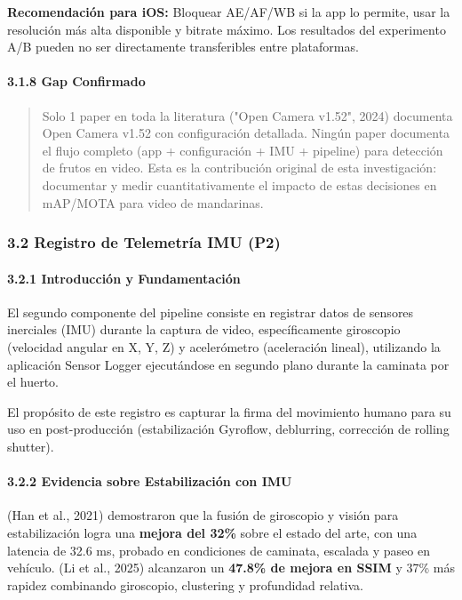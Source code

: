 \textbf{Recomendación para iOS:} Bloquear AE/AF/WB si la app lo permite, usar la resolución más alta disponible y bitrate máximo. Los resultados del experimento A/B pueden no ser directamente transferibles entre plataformas.


\paragraph{3.1.8 Gap Confirmado}


\begin{quote}
Solo 1 paper en toda la literatura ("Open Camera v1.52", 2024) documenta Open Camera v1.52 con configuración detallada. Ningún paper documenta el flujo completo (app + configuración + IMU + pipeline) para detección de frutos en video. Esta es la contribución original de esta investigación: documentar y medir cuantitativamente el impacto de estas decisiones en mAP/MOTA para video de mandarinas.
\end{quote}


\subsubsection{3.2 Registro de Telemetría IMU (P2)}


\paragraph{3.2.1 Introducción y Fundamentación}


El segundo componente del pipeline consiste en registrar datos de sensores inerciales (IMU) durante la captura de video, específicamente giroscopio (velocidad angular en X, Y, Z) y acelerómetro (aceleración lineal), utilizando la aplicación Sensor Logger ejecutándose en segundo plano durante la caminata por el huerto.


El propósito de este registro es capturar la firma del movimiento humano para su uso en post-producción (estabilización Gyroflow, deblurring, corrección de rolling shutter).


\paragraph{3.2.2 Evidencia sobre Estabilización con IMU}


(Han et al., 2021) demostraron que la fusión de giroscopio y visión para estabilización logra una \textbf{mejora del 32\%} sobre el estado del arte, con una latencia de 32.6 ms, probado en condiciones de caminata, escalada y paseo en vehículo. (Li et al., 2025) alcanzaron un \textbf{47.8\% de mejora en SSIM} y 37\% más rapidez combinando giroscopio, clustering y profundidad relativa.


